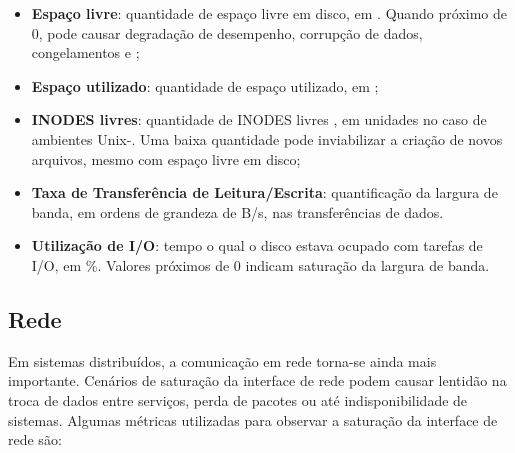 \begin{itemize}
\item \textbf{Espaço livre}: quantidade de espaço livre em disco, em . Quando próximo de 0, pode causar degradação de desempenho, corrupção de dados, congelamentos e ;

\item \textbf{Espaço utilizado}: quantidade de espaço utilizado, em ;

\item \textbf{INODES livres}: quantidade de INODES livres \citep{inodes2025}, em unidades no caso de ambientes Unix-. Uma baixa quantidade pode inviabilizar a criação de novos arquivos, mesmo com espaço livre em disco;

\item \textbf{Taxa de Transferência de Leitura/Escrita}: quantificação da largura de banda, em ordens de grandeza de B/s, nas transferências de dados.

\item \textbf{Utilização de I/O}: tempo o qual o disco estava ocupado com tarefas de I/O, em \%. Valores próximos de 0 indicam saturação da largura de banda.
\end{itemize}

\subsection{Rede}
\label{subsection:Rede}

Em sistemas distribuídos, a comunicação em rede torna-se ainda mais importante. Cenários de saturação da interface de rede \citep{netmetrics2025} podem causar lentidão na troca de dados entre serviços, perda de pacotes ou até indisponibilidade de sistemas. Algumas métricas utilizadas para observar a saturação da interface de rede são:

